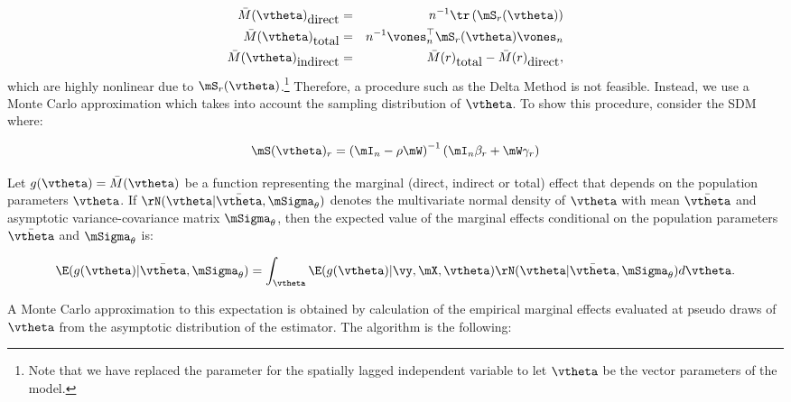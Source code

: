 \documentclass[english,12pt]{book}\usepackage[]{graphicx}\usepackage[]{xcolor}
\begin{document}
\begin{eqnarray*}
\bar{M}(\vtheta)_{\mbox{direct}} & = & n^{-1}\tr\left(\mS_r(\vtheta)\right) \\
\bar{M}(\vtheta)_{\mbox{total}} & = & n^{-1}\vones_n^\top\mS_r(\vtheta)\vones_n \\
\bar{M}(\vtheta)_{\mbox{indirect}} & = & \bar{M}(r)_{\mbox{total}} - \bar{M}(r)_{\mbox{direct}},
\end{eqnarray*}
%
which are highly nonlinear due to $\mS_r(\vtheta)$.\footnote{Note that we have replaced the parameter for the spatially lagged independent variable to let $\vtheta$ be the vector parameters of the model. } Therefore, a procedure such as the Delta Method is not feasible. Instead, we use a Monte Carlo approximation which takes into account the sampling distribution of $\vtheta$. To show this procedure, consider the SDM where:

\begin{equation*}
\mS(\vtheta)_r = \left(\mI_n - \rho\mW\right)^{-1}\left(\mI_n\beta_r + \mW\gamma_r\right)
\end{equation*}


Let $g(\vtheta)= \bar{M}(\vtheta)$ be a function representing the marginal (direct, indirect or total) effect that depends on the population parameters $\vtheta$. If $\rN(\vtheta|\bar{\vtheta}, \mSigma_{\theta})$ denotes the multivariate normal density of $\vtheta$ with mean $\bar{\vtheta}$ and asymptotic variance-covariance matrix $\mSigma_{\theta}$, then the expected value of the marginal effects conditional on the population parameters $\bar{\vtheta}$ and $\mSigma_{\theta}$ is:

\begin{equation}
\E(g(\vtheta)|\bar{\vtheta}, \mSigma_{\theta}) = \int_{\vtheta}\E(g(\vtheta)|\vy, \mX, \vtheta)\rN(\vtheta|\bar{\vtheta}, \mSigma_{\theta})d\vtheta. 
\end{equation}

A Monte Carlo approximation to this expectation is obtained by calculation of the empirical marginal effects evaluated at pseudo draws of $\vtheta$ from the asymptotic distribution of the estimator. The algorithm is the following:
\end{document}

